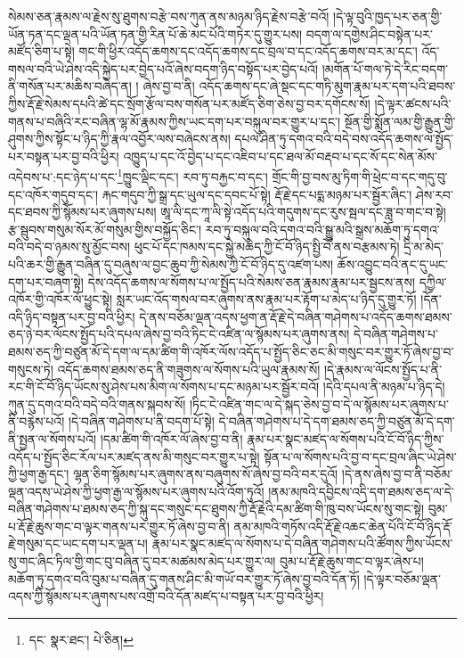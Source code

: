 སེམས་ཅན་རྣམས་ལ་རྗེས་སུ་ཐུགས་བརྩེ་བས་ཀུན་ནས་མཉམ་ཉིད་རྗེས་བརྩེ་བའོ། །དེ་ལྟ་བུའི་ཁྱད་པར་ཅན་གྱི་ཡོན་ཏན་དང་ལྡན་པའི་ཡོན་ཏན་གྱི་རིན་པོ་ཆེ་མང་པོའི་གཏེར་དུ་གྱུར་པས། བདག་ལ་དགྱེས་ཤིང་བསྟེན་པར་མཛོད་ཅིག་པ་སྟེ། གང་གི་ཕྱིར་འདོད་ཆགས་དང་འདོད་ཆགས་དང་བྲལ་བ་དང་འདོད་ཆགས་བར་མ་དང་། འོད་གསལ་བའི་ཡེ་ཤེས་འདི་སྐྱེད་པར་བྱེད་པའོ་ཞེས་བདག་ཉིད་བསྟོད་པར་བྱེད་པའོ། །མགོན་པོ་གལ་ཏེ་དེ་རིང་བདག་ནི་གསོན་པར་མཆིས་བཞེད་ན། །
ཞེས་བྱ་བ་ནི། འདོད་ཆགས་དང་ཞེ་སྡང་དང་གཏི་མུག་རྣམ་པར་དག་པའི་ཐབས་ཀྱིས་རྡོ་རྗེ་སེམས་དཔའི་ཚེ་དང་སྲོག་རྩོལ་བས་གསོན་པར་མཛོད་ཅིག་ཅེས་བྱ་བར་དགོངས་སོ། །དེ་ལྟར་ཚངས་པའི་གནས་པ་བཞིའི་རང་བཞིན་ལྷ་མོ་རྣམས་ཀྱིས་ཡང་དག་པར་བསྐུལ་བར་གྱུར་པ་དང་། སྔོན་གྱི་སྨོན་ལམ་གྱི་རྒྱུན་གྱི་ཤུགས་ཀྱིས་སྟོང་པ་ཉིད་ཀྱི་རྣལ་འབྱོར་ལས་བཞེངས་ནས། དཔལ་ཤིན་ཏུ་དགའ་བའི་བདེ་བས་འདོད་ཆགས་ལ་སྤྱོད་པར་བསྟན་པར་བྱ་བའི་ཕྱིར། འཁྱུད་པ་དང་འོ་བྱེད་པ་དང་འཇིབ་པ་དང་ཐལ་མོ་བརྡབ་པ་དང་སོ་དང་སེན་མོས་འདེབས་པ་:དང་ཉེད་པ་དང་\footnote{དང་  སྣར་ཐང་།  པེ་ཅིན། }ཁྱུང་ལྡིང་དང་། རབ་ཏུ་བརྐྱང་བ་དང་། གྲོང་གི་བྱ་བས་མུ་ཏིག་གི་ཕྲེང་བ་དང་གདུ་བུ་དང་འཁོར་གདུབ་དང་། རྐང་གདུབ་ཀྱི་སྒྲ་དང་ཡུལ་དང་དབང་པོ་སྟེ། རྡོ་རྗེ་དང་པདྨ་མཉམ་པར་སྦྱོར་ཞིང་། ཤེས་རབ་དང་ཐབས་ཀྱི་སྙོམས་པར་ཞུགས་པས། ཨཱ་ལི་དང་ཀཱ་ལི་སྟེ་འདོད་པའི་གདུགས་དང་རུས་སྦལ་དང་ཟླ་བ་གང་བ་སྟེ། རྩ་སྦུབས་གསུམ་སོར་མོ་གསུམ་གྱིས་བསྐྱོད་ཅིང་། རབ་ཏུ་བསྐུལ་བའི་དགའ་བའི་སྒྱུ་མའི་སྒྲས་མཆོག་ཏུ་དགའ་བའི་བདེ་བ་ཉམས་སུ་མྱོང་བས། ཕུང་པོ་དང་ཁམས་དང་སྐྱེ་མཆེད་ཀྱི་ངོ་བོ་ཉིད་སྤྱི་བོ་ནས་བརྩམས་ཏེ། དྲི་མ་མེད་པའི་ཆར་གྱི་རྒྱུན་བཞིན་དུ་བཞུས་ལ་བྱང་ཆུབ་ཀྱི་སེམས་ཀྱི་ངོ་བོ་ཉིད་དུ་འཛག་པས། ཆོས་འབྱུང་བའི་ནང་དུ་ཡང་དག་པར་བཞག་སྟེ། དེས་འདོད་ཆགས་ལ་སོགས་པ་ལ་སྤྱོད་པའི་སེམས་ཅན་རྣམས་རྣམ་པར་སྦྱངས་ནས། དཀྱིལ་འཁོར་གྱི་འཁོར་ལོ་ཕྱུང་སྟེ། སླར་ཡང་འོད་གསལ་བར་ཞུགས་ནས་རྣམ་པར་རྟོག་པ་མེད་པ་ཉིད་དུ་གྱུར་ཏོ། །དོན་འདི་ཉིད་བསྟན་པར་བྱ་བའི་ཕྱིར། དེ་ནས་བཅོམ་ལྡན་འདས་ཕྱག་ན་རྡོ་རྗེ་དེ་བཞིན་གཤེགས་པ་འདོད་ཆགས་ཐམས་ཅད་ཉེ་བར་ལོངས་སྤྱོད་པའི་དཔལ་ཞེས་བྱ་བའི་ཏིང་ངེ་འཛིན་ལ་སྙོམས་པར་ཞུགས་ནས། དེ་བཞིན་གཤེགས་པ་ཐམས་ཅད་ཀྱི་བཙུན་མོ་དེ་དག་ལ་དམ་ཚིག་གི་འཁོར་ལོས་འདོད་པ་སྤྱོད་ཅིང་ཅང་མི་གསུང་བར་གྱུར་ཏོ་ཞེས་བྱ་བ་གསུངས་ཏེ། འདོད་ཆགས་ཐམས་ཅད་ནི་གཟུགས་ལ་སོགས་པའི་ཡུལ་རྣམས་སོ། །དེ་རྣམས་ལ་ལོངས་སྤྱོད་པ་ནི་རང་གི་ངོ་བོ་ཉིད་ཡོངས་སུ་ཤེས་པས་མིག་ལ་སོགས་པ་དང་མཉམ་པར་སྦྱོར་བའོ། །དེའི་དཔལ་ནི་མཉམ་པ་ཉིད་དེ། ཀུན་དུ་དགའ་བའི་བདེ་བའི་གནས་སྐབས་སོ། །ཏིང་ངེ་འཛིན་གང་ལ་དེ་སྐད་ཅེས་བྱ་བ་དེ་ལ་སྙོམས་པར་ཞུགས་པ་ནི་བརྙེས་པའོ། །དེ་བཞིན་གཤེགས་པ་ནི་བདག་པོ་སྟེ། དེ་བཞིན་གཤེགས་པ་དེ་དག་ཐམས་ཅད་ཀྱི་བཙུན་མོ་དེ་དག་ནི་སྤྱན་ལ་སོགས་པའོ། །དམ་ཚིག་གི་འཁོར་ལོ་ཞེས་བྱ་བ་ནི། རྣམ་པར་སྣང་མཛད་ལ་སོགས་པའི་ངོ་བོ་ཉིད་ཀྱིས་འདོད་པ་སྤྱོད་ཅིང་རོལ་པར་མཛད་ནས་མི་གསུང་བར་གྱུར་པ་སྟེ། སྟོན་པ་ལ་སོགས་པའི་བྱ་བ་དང་བྲལ་ཞིང་ཡེ་ཤེས་ཀྱི་ཕྱག་རྒྱ་དང་། ལྷན་ཅིག་སྙོམས་པར་ཞུགས་ནས་བཞུགས་སོ་ཞེས་བྱ་བའི་བར་དུའོ། །དེ་ནས་ཞེས་བྱ་བ་ནི་བཅོམ་ལྡན་འདས་ཡེ་ཤེས་ཀྱི་ཕྱག་རྒྱ་ལ་སྙོམས་པར་ཞུགས་པའི་འོག་ཏུའོ། །ནམ་མཁའི་དབྱིངས་འདི་དག་ཐམས་ཅད་ལ་དེ་བཞིན་གཤེགས་པ་ཐམས་ཅད་ཀྱི་སྐུ་དང་གསུང་དང་ཐུགས་ཀྱི་རྡོ་རྗེའི་དམ་ཚིག་གི་ཁུ་བས་ཡོངས་སུ་གང་སྟེ། བུམ་པ་རྡོ་རྗེ་ཆུས་གང་བ་ལྟར་གནས་པར་གྱུར་ཏོ་ཞེས་བྱ་བ་ནི། ནམ་མཁའི་གཏོས་འདི་རྡོ་རྗེ་འཆང་ཆེན་པོའི་ངོ་བོ་ཉིད་རྡོ་རྗེ་གསུམ་དང་ཡང་དག་པར་ལྡན་པ། རྣམ་པར་སྣང་མཛད་ལ་སོགས་པ་དེ་བཞིན་གཤེགས་པའི་ཚོགས་ཀྱིས་ཡོངས་སུ་གང་ཞིང་ཏིལ་གྱི་གང་བུ་བཞིན་དུ་བར་མཚམས་མེད་པར་གྱུར་ལ། བུམ་པ་རྡོ་རྗེ་ཆུས་གང་བ་ལྟར་ཞེས་པ། མཆོག་ཏུ་དགའ་བའི་བུམ་པ་བཞིན་དུ་གནས་ཤིང་མི་གཡོ་བར་གྱུར་ཏོ་ཞེས་བྱ་བའི་དོན་ཏོ། །དེ་ལྟར་བཅོམ་ལྡན་འདས་ཀྱི་སྙོམས་པར་ཞུགས་པས་འགྲོ་བའི་དོན་མཛད་པ་བསྟན་པར་བྱ་བའི་ཕྱིར། 